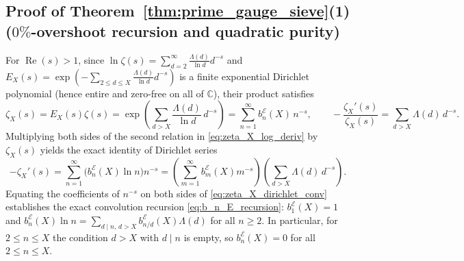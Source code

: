 \documentclass[11pt,reqno,a4paper]{amsart}
\theoremstyle{plain}
\theoremstyle{definition}
\theoremstyle{remark}
\numberwithin{equation}{section}
\begin{document}
\subsection{Proof of Theorem~\ref{thm:prime_gauge_sieve}(1) ($0\%$-overshoot recursion and quadratic purity)}\label{app:overshoot_proof}
For $\operatorname{Re}(s) > 1$, since $\ln\zeta(s) = \sum_{d=2}^\infty\frac{\Lambda(d)}{\ln d}d^{-s}$ and $E_X(s) = \exp(-\sum_{2 \le d \le X}\frac{\Lambda(d)}{\ln d}d^{-s})$ is a finite exponential Dirichlet polynomial (hence entire and zero-free on all of $\mathbb{C}$), their product satisfies
\begin{equation}\label{eq:zeta_X_log_deriv}
  \zeta_X(s) = E_X(s)\zeta(s) = \exp\left(\sum_{d > X}\frac{\Lambda(d)}{\ln d}\,d^{-s}\right) = \sum_{n=1}^{\infty} b_n^{\mathcal{E}}(X)\,n^{-s}, \qquad
  -\frac{\zeta_X'(s)}{\zeta_X(s)} = \sum_{d > X}\Lambda(d)\,d^{-s}.
\end{equation}
Multiplying both sides of the second relation in \eqref{eq:zeta_X_log_deriv} by $\zeta_X(s)$ yields the exact identity of Dirichlet series
\begin{equation}\label{eq:zeta_X_dirichlet_conv}
  -\zeta_X'(s) = \sum_{n=1}^{\infty}\big(b_n^{\mathcal{E}}(X)\ln n\big)n^{-s}
  = \left(\sum_{m=1}^{\infty}b_m^{\mathcal{E}}(X)m^{-s}\right)\left(\sum_{d > X}\Lambda(d)\,d^{-s}\right).
\end{equation}
Equating the coefficients of $n^{-s}$ on both sides of \eqref{eq:zeta_X_dirichlet_conv} establishes the exact convolution recursion \eqref{eq:b_n_E_recursion}: $b_1^{\mathcal{E}}(X) = 1$ and $b_n^{\mathcal{E}}(X)\ln n = \sum_{d \mid n,\, d > X} b_{n/d}^{\mathcal{E}}(X)\Lambda(d)$ for all $n \ge 2$. In particular, for $2 \le n \le X$ the condition $d > X$ with $d \mid n$ is empty, so $b_n^{\mathcal{E}}(X) = 0$ for all $2 \le n \le X$.
\end{document}
